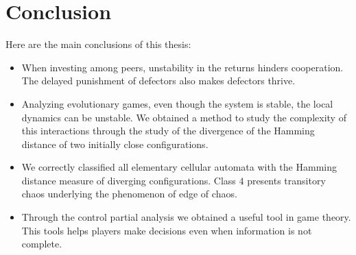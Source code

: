 \chapter{Conclusion}
\label{chap:Conclusion}

Here are the main conclusions of this thesis:

\begin{itemize}

\item When investing among peers, unstability in the returns hinders cooperation. The delayed punishment of defectors also makes defectors thrive.

\item Analyzing evolutionary games, even though the system is stable, the local dynamics can be unstable. We obtained a method to study the complexity of this interactions through the study of the divergence of the Hamming distance of two initially close configurations.

\item We correctly classified all elementary cellular automata with the Hamming distance measure of diverging configurations. Class $4$ presents transitory chaos underlying the phenomenon of edge of chaos.

\item Through the control partial analysis we obtained a useful tool in game theory. This tools helps players make decisions even when information is not complete.

\end{itemize}


